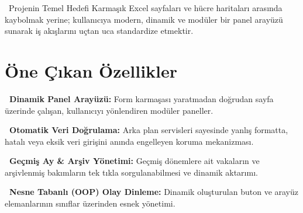 \begin{infobox}{\faLightbulb\ Projenin Temel Hedefi}
Karmaşık Excel sayfaları ve hücre haritaları arasında kaybolmak yerine; kullanıcıya modern, dinamik ve modüler bir panel arayüzü sunarak iş akışlarını uçtan uca standardize etmektir.
\end{infobox}

\vspace{0.3cm}

\section{Öne Çıkan Özellikler}

\begin{tcolorbox}[colback=lightgray,colframe=bordergray,leftrule=3pt,boxrule=0.5pt,top=6pt,bottom=6pt]
    \textbf{\textcolor{primary}{\faDesktop\ Dinamik Panel Arayüzü:}} Form karmaşası yaratmadan doğrudan sayfa üzerinde çalışan, kullanıcıyı yönlendiren modüler paneller.
\end{tcolorbox}

\begin{tcolorbox}[colback=lightgray,colframe=bordergray,leftrule=3pt,boxrule=0.5pt,top=6pt,bottom=6pt]
    \textbf{\textcolor{primary}{\faUserShield\ Otomatik Veri Doğrulama:}} Arka plan servisleri sayesinde yanlış formatta, hatalı veya eksik veri girişini anında engelleyen koruma mekanizması.
\end{tcolorbox}

\begin{tcolorbox}[colback=lightgray,colframe=bordergray,leftrule=3pt,boxrule=0.5pt,top=6pt,bottom=6pt]
    \textbf{\textcolor{primary}{\faHistory\ Geçmiş Ay \& Arşiv Yönetimi:}} Geçmiş dönemlere ait vakaların ve arşivlenmiş bakımların tek tıkla sorgulanabilmesi ve dinamik aktarımı.
\end{tcolorbox}

\begin{tcolorbox}[colback=lightgray,colframe=bordergray,leftrule=3pt,boxrule=0.5pt,top=6pt,bottom=6pt]
    \textbf{\textcolor{primary}{\faCode\ Nesne Tabanlı (OOP) Olay Dinleme:}} Dinamik oluşturulan buton ve arayüz elemanlarının sınıflar üzerinden esnek yönetimi.
\end{tcolorbox}

\vspace{0.3cm}
